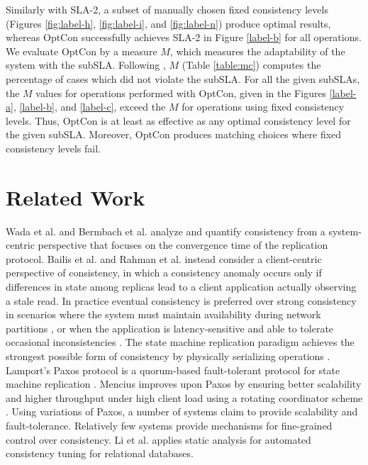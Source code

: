 \documentclass[conference]{IEEEtran}
\begin{document}
 Similarly with SLA-2, a subset of manually chosen fixed consistency levels (Figures \ref{fig:label-h}, \ref{fig:label-i}, and \ref{fig:label-n}) produce optimal results, whereas OptCon successfully achieves SLA-2 in Figure \ref{label-b} for all operations. We evaluate OptCon by a measure \emph{$M$}, which measures the adaptability of the system with the subSLA. Following \cite{Terry:2013:CSL:2517349.2522731}, $M$ (Table \ref{table:mc}) computes the percentage of cases which did not violate the subSLA. For all the given subSLAs, the $M$ values for operations performed with OptCon, given in the Figures \ref{label-a}, \ref{label-b}, and
\ref{label-c}, exceed the $M$ for operations using fixed consistency levels. Thus, OptCon is at least as effective as any optimal
  consistency level for the given subSLA. Moreover, OptCon produces matching
choices where fixed consistency levels fail. 
\section{Related Work}\label{sec:related}
Wada et al. \cite{wada:cidr} and Bermbach et al. \cite{Bermbach} analyze and quantify consistency from a system-centric perspective that
	focuses on the convergence time of the replication protocol.
Bailis et al. \cite{Bailis:2012:PBS:2212351.2212359} and Rahman et al. \cite{Rahman:2012:TPF:2387858.2387866} instead consider a client-centric perspective of consistency,  in which a consistency anomaly occurs
	only if differences in state among replicas lead to a client application actually observing a stale read.
In practice eventual consistency is preferred over strong consistency in scenarios where the system must maintain availability during network partitions \cite{birman1996trading, bayou},
	or when the application is latency-sensitive and able to tolerate occasional inconsistencies
\cite{brew:cap}. The state machine replication paradigm achieves the strongest possible form of consistency
	by physically serializing operations \cite{lam_time}.
Lamport's Paxos protocol is a quorum-based fault-tolerant protocol for state machine replication \cite{DBLP:conf/opodis/Lamport02}.
Mencius improves upon Paxos by ensuring better scalability and higher throughput under high client load
	using a rotating coordinator scheme \cite{Mao:2008:MBE:1855741.1855767}.
  Using variations of Paxos, a number of systems \cite{journals/corr/abs-1103-2408, Bolosky:2011:PRS:1972457.1972472, Kraska:2013:MMC:2465351.2465363, Corbett:2012:SGG:2387880.2387905} claim to provide scalability and fault-tolerance. Relatively few systems \cite{conf/wecwis/YuV00, Terry:2013:CSL:2517349.2522731, Ardekani:2014:SGC:2685048.2685077, Sivaramakrishnan:2015:DPO:2813885.2737981} provide mechanisms for fine-grained control over consistency. Li et al. \cite{183989} applies static analysis for automated consistency tuning for relational databases.  
\end{document}
